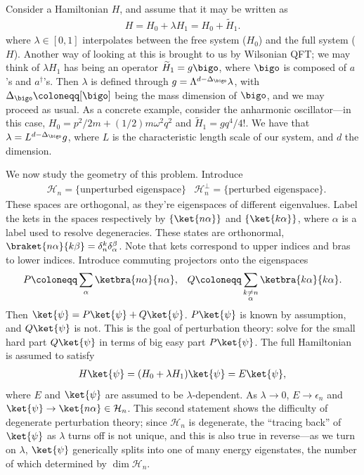 \documentclass[11pt]{article}
\begin{document}
Consider a Hamiltonian $H$, and assume that it may be written as
\begin{align*}
    H = H_0 + \lambda H_1 = H_0 + \widetilde{H}_1.
\end{align*}
where $\lambda \in [0, 1]$ interpolates between the free system ($H_0$)
and the full system ($H$). Another way of looking at this is brought to us
by Wilsonian QFT; we may think of $\lambda H_1$ has being an operator
$\widetilde{H}_1 = g \bigo$, where $\bigo$ is composed of $a$'s and $a^\dagger$'s.
Then $\lambda$ is defined through $g = \Lambda^{d - \Delta_\bigo} \lambda$,
with $\Delta_\bigo \coloneqq [\bigo]$ being the mass dimension of $\bigo$,
and we may proceed as usual. As a concrete example, consider the anharmonic 
oscillator---in this case, $H_0 = p^2/2m + (1/2)m\omega^2 q^2$ and 
$\widetilde{H}_1 = g q^4 / 4!$. We have that $\lambda = L^{d - \Delta_\bigo} g$, 
where $L$ is the characteristic length scale of our system, and $d$ the dimension.

We now study the geometry of this problem. Introduce
\begin{align*}
    & \mathcal{H}_n = \{ \text{unperturbed eigenspace} \}
    & \mathcal{H}_n^\perp = \{ \text{perturbed eigenspace} \}.
\end{align*}
These spaces are orthogonal, as they're eigenspaces of different
eigenvalues. Label the kets in the spaces respectively by $\{ \ket{n\alpha} \}$ and 
$\{ \ket{k \alpha} \}$, where $\alpha$ is a label used to resolve 
degeneracies. These states are orthonormal, $\braket{n\alpha}{k\beta} = \delta^{k}_n \delta^{\beta}_\alpha$.
Note that kets correspond to upper indices and bras to lower indices.
Introduce commuting projectors onto the eigenspaces
\begin{align*}
    & P \coloneqq \sum_{\alpha}
    \ketbra{n\alpha}{n\alpha},
    & Q \coloneqq \sum_{\substack{k \neq n \\ \alpha}} \ketbra{k\alpha}{k\alpha}.
\end{align*}
Then $\ket{\psi} = P \ket{\psi} + Q \ket{\psi}$. $P\ket{\psi}$ is known by assumption,
and $Q\ket{\psi}$ is not. This is the goal of perturbation theory: solve for the small hard part
$Q\ket{\psi}$ in terms of big easy part $P\ket{\psi}$. The full Hamiltonian is assumed
to satisfy
\begin{align}
    \label{eq:PTenergyEvals}
    H \ket{\psi} = (H_0 + \lambda H_1)\ket{\psi} = E \ket{\psi},
\end{align}
where $E$ and $\ket{\psi}$ are assumed to be $\lambda$-dependent. As $\lambda \to 0$,
$E \to \epsilon_n$ and $\ket{\psi} \to \ket{n\alpha} \in \mathcal{H}_n$. This second
statement shows the difficulty of degenerate perturbation theory; since $\mathcal{H}_n$
is degenerate, the ``tracing back'' of $\ket{\psi}$ as $\lambda$ turns off is not unique,
and this is also true in reverse---as we turn on $\lambda$, $\ket{\psi}$ generically splits
into one of many energy eigenstates, the number of which determined by $\dim{\mathcal{H}_n}$.
\end{document}

